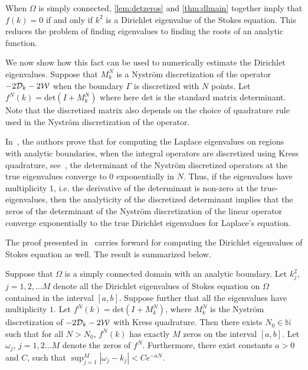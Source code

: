When $\Omega$ is simply connected, \cref{lem:detzeros} and 
\cref{thm:dlmain} together imply that $f(k) = 0$
if and only if $k^2$ 
is a Dirichlet eigenvalue of the Stokes equation.
This reduces the problem of finding eigenvalues to
finding the roots of an analytic function.

We now show how this fact can be used to numerically
estimate the Dirichlet eigenvalues.
Suppose that $M_{k}^{N}$ is a Nystr\"{o}m discretization 
of the operator $-2{\mathcal D}_{k} - 2{\mathcal W}$ when the boundary 
$\Gamma$ is discretized with $N$ points. 
Let $f^{N}(k) = \text{det}(I + M_{k}^{N})$
where here $\text{det}$ is the standard matrix determinant.
Note that the discretized matrix also depends on the choice
of quadrature rule used in the Nystr\"{o}m discretization
of the operator.

In~\cite{zhao2015robust}, the authors prove that
for computing the Laplace eigenvalues on regions with 
analytic boundaries, when the integral operators are
discretized using Kress quadrature, see~\cite{kress1991boundary},
the determinant of the Nystr\"{o}m discretized operators
at the true eigenvalues converge to $0$ exponentially
in $N$.
Thus, if the eigenvalues have multiplicity $1$,
i.e. the derivative of the determinant is non-zero
at the true-eigenvalues, then the analyticity of the
discretized determinant implies that the zeros
of the determinant of the Nystr\"{o}m discretization
of the linear operator converge exponentially to
the true Dirichlet eigenvalues for Laplace's equation.

The proof presented in~\cite{zhao2015robust} carries
forward for computing the Dirichlet eigenvalues of
Stokes equation as well.
The result is summarized below.
\begin{thrm}
\label{thm:mainconvfreddet}
Suppose that $\Omega$ is a simply connected
domain with an analytic boundary. Let $k_{j}^2$, $j=1,2,\ldots M$
denote all the Dirichlet eigenvalues of Stokes equation
on $\Omega$ contained in the interval $[a,b]$. 
Suppose further that all the eigenvalues have multiplicity $1$.
Let $f^{N}(k) = \text{det}(I+M^{N}_{k})$, where $M^{N}_{k}$ 
is the Nystr\"{o}m discretization of $-2{\mathcal D}_{k} - 2{\mathcal W}$ with Kress
quadrature.
Then there exists $N_{0} \in \mathbb{N}$ such
that for all $N>N_{0}$, 
$f^{N}(k)$ has exactly $M$ zeros on the interval $[a,b]$.
Let $\omega_{j}$, $j=1,2\ldots M$ denote the zeros of $f^{N}$.
Furthermore, there exist constants $a>0$ and $C$, 
such that $\sup_{j=1}^{M} |\omega_{j} - k_{j}| < C e^{-aN}$.
\end{thrm}

